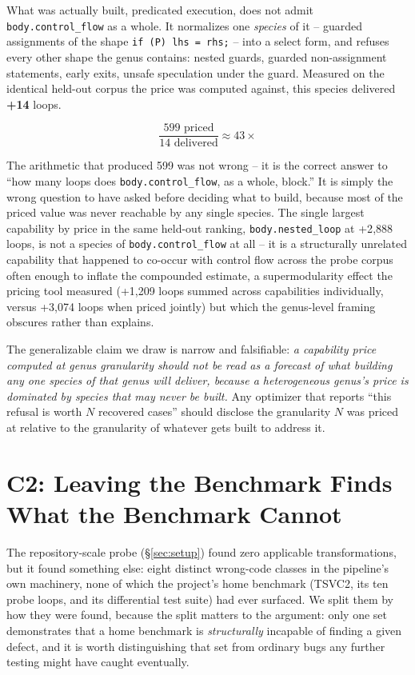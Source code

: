 \documentclass[sigconf,review,anonymous]{acmart}
\begin{document}
What was actually built, predicated execution, does not admit
\texttt{body.control\_flow} as a whole. It normalizes one \emph{species} of
it -- guarded assignments of the shape \texttt{if (P) lhs = rhs;} -- into a
select form, and refuses every other shape the genus contains: nested
guards, guarded non-assignment statements, early exits, unsafe speculation
under the guard. Measured on the identical held-out corpus the price was
computed against, this species delivered \textbf{+14} loops.

\[
\frac{599 \text{ priced}}{14 \text{ delivered}} \approx 43\times
\]

The arithmetic that produced 599 was not wrong -- it is the correct answer
to ``how many loops does \texttt{body.control\_flow}, as a whole, block.''
It is simply the wrong question to have asked before deciding what to build,
because most of the priced value was never reachable by any single species.
The single largest capability by price in the same held-out ranking,
\texttt{body.nested\_loop} at +2{,}888 loops, is not a species of
\texttt{body.control\_flow} at all -- it is a structurally unrelated
capability that happened to co-occur with control flow across the probe
corpus often enough to inflate the compounded estimate, a supermodularity
effect the pricing tool measured (+1{,}209 loops summed across capabilities
individually, versus +3{,}074 loops when priced jointly) but which the
genus-level framing obscures rather than explains.

The generalizable claim we draw is narrow and falsifiable: \emph{a
capability price computed at genus granularity should not be read as a
forecast of what building any one species of that genus will deliver,
because a heterogeneous genus's price is dominated by species that may never
be built.} Any optimizer that reports ``this refusal is worth $N$ recovered
cases'' should disclose the granularity $N$ was priced at relative to the
granularity of whatever gets built to address it.

\section{C2: Leaving the Benchmark Finds What the Benchmark Cannot}
\label{sec:c2}

The repository-scale probe (\S\ref{sec:setup}) found zero applicable
transformations, but it found something else: eight distinct wrong-code
classes in the pipeline's own machinery, none of which the project's home
benchmark (TSVC2, its ten probe loops, and its differential test suite) had
ever surfaced. We split them by how they were found, because the split
matters to the argument: only one set demonstrates that a home benchmark is
\emph{structurally} incapable of finding a given defect, and it is worth
distinguishing that set from ordinary bugs any further testing might have
caught eventually.
\end{document}
